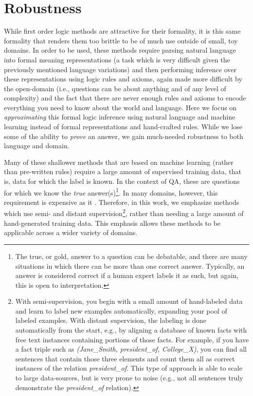 \section{Robustness}
\label{sec:robustness}

While first order logic methods are attractive for their formality, it is this same formality that renders them too brittle to be of much use outside of small, toy domains.  In order to be used, these methods require parsing natural language into formal meaning representations (a task which is very difficult given the previously mentioned language variations) and then performing inference over these representations using logic rules and axioms, again made more difficult by the open-domain (i.e., questions can be about anything and of any level of complexity) and the fact that there are never enough rules and axioms to encode everything you need to know about the world and language.  Here we focus on \emph{approximating} this formal logic inference using natural language and machine learning instead of formal representations and hand-crafted rules.  While we lose some of the ability to \emph{prove} an answer, we gain much-needed robustness to both language and domain.

Many of these shallower methods that are based on machine learning  (rather than pre-written rules) require a large amount of supervised training data, that is, data for which the label is known.  In the context of QA, these are questions for which we know the \emph{true} answer(s)\footnote{The true, or gold, answer to a question can be debatable, and there are many situations in which there can be more than one correct answer.  Typically, an answer is considered correct if a human expert labels it as such, but again, this is open to interpretation.}. In many domains, however, this requirement is expensive as it .  Therefore, in this work, we emphasize methods which use semi- and distant supervision\footnote{With semi-supervision, you begin with a small amount of hand-labeled data and learn to label new examples automatically, expanding your pool of labeled examples.  With distant supervision, the labeling is done automatically from the start, e.g., by aligning a database of known facts with free text instances containing portions of those facts.  For example, if you have a fact triple such as \textit{(Jane\_Smith, president\_of, College\_X)}, you can find all sentences that contain those three elements and count them all as correct instances of the relation \textit{president\_of}.  This type of approach is able to scale to large data-sources, but is very prone to noise (e.g., not all sentences truly demonstrate the \textit{president\_of} relation).}, rather than needing a large amount of hand-generated training data.  This emphasis allows these methods to be applicable across a wider variety of domains.   

